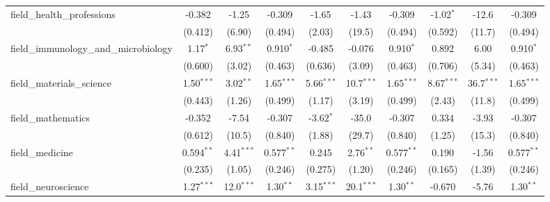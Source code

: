 \begin{tabular}{lccccccccc}
   field\_health\_professions                                  & -0.382         & -1.25          & -0.309        & -1.65         & -1.43          & -0.309        & -1.02$^{*}$   & -12.6         & -0.309\\   
                                                               & (0.412)        & (6.90)         & (0.494)       & (2.03)        & (19.5)         & (0.494)       & (0.592)       & (11.7)        & (0.494)\\   
   field\_immunology\_and\_microbiology                        & 1.17$^{*}$     & 6.93$^{**}$    & 0.910$^{*}$   & -0.485        & -0.076         & 0.910$^{*}$   & 0.892         & 6.00          & 0.910$^{*}$\\   
                                                               & (0.600)        & (3.02)         & (0.463)       & (0.636)       & (3.09)         & (0.463)       & (0.706)       & (5.34)        & (0.463)\\   
   field\_materials\_science                                   & 1.50$^{***}$   & 3.02$^{**}$    & 1.65$^{***}$  & 5.66$^{***}$  & 10.7$^{***}$   & 1.65$^{***}$  & 8.67$^{***}$  & 36.7$^{***}$  & 1.65$^{***}$\\   
                                                               & (0.443)        & (1.26)         & (0.499)       & (1.17)        & (3.19)         & (0.499)       & (2.43)        & (11.8)        & (0.499)\\   
   field\_mathematics                                          & -0.352         & -7.54          & -0.307        & -3.62$^{*}$   & -35.0          & -0.307        & 0.334         & -3.93         & -0.307\\   
                                                               & (0.612)        & (10.5)         & (0.840)       & (1.88)        & (29.7)         & (0.840)       & (1.25)        & (15.3)        & (0.840)\\   
   field\_medicine                                             & 0.594$^{**}$   & 4.41$^{***}$   & 0.577$^{**}$  & 0.245         & 2.76$^{**}$    & 0.577$^{**}$  & 0.190         & -1.56         & 0.577$^{**}$\\   
                                                               & (0.235)        & (1.05)         & (0.246)       & (0.275)       & (1.20)         & (0.246)       & (0.165)       & (1.39)        & (0.246)\\   
   field\_neuroscience                                         & 1.27$^{***}$   & 12.0$^{***}$   & 1.30$^{**}$   & 3.15$^{***}$  & 20.1$^{***}$   & 1.30$^{**}$   & -0.670        & -5.76         & 1.30$^{**}$\\   

\end{tabular}
